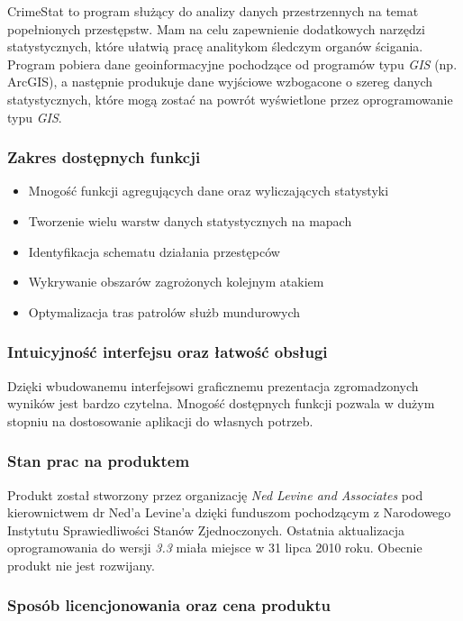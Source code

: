 \documentclass[11pt,a4paper]{article}
\begin{document}
CrimeStat to program służący do analizy danych przestrzennych na temat popełnionych przestępstw. Mam na celu zapewnienie dodatkowych narzędzi statystycznych, które ułatwią pracę analitykom śledczym organów ścigania. Program pobiera dane geoinformacyjne pochodzące od programów typu \emph{GIS} (np. ArcGIS), a następnie produkuje dane wyjściowe wzbogacone o szereg danych statystycznych, które mogą zostać na powrót wyświetlone przez oprogramowanie typu \emph{GIS}. 

\subsubsection*{Zakres dostępnych funkcji}

\begin{itemize}
	\item Mnogość funkcji agregujących dane oraz wyliczających statystyki
	\item Tworzenie wielu warstw danych statystycznych na mapach
	\item Identyfikacja schematu działania przestępców
	\item Wykrywanie obszarów zagrożonych kolejnym atakiem
	\item Optymalizacja tras patrolów służb mundurowych
\end{itemize}

\subsubsection*{Intuicyjność interfejsu oraz łatwość obsługi}

Dzięki wbudowanemu interfejsowi graficznemu prezentacja zgromadzonych wyników jest bardzo czytelna. Mnogość dostępnych funkcji pozwala w dużym stopniu na dostosowanie aplikacji do własnych potrzeb.

\subsubsection*{Stan prac na produktem}

Produkt został stworzony przez organizację \emph{Ned Levine and Associates} pod kierownictwem dr Ned'a Levine'a dzięki funduszom pochodzącym z Narodowego Instytutu Sprawiedliwości Stanów Zjednoczonych. Ostatnia aktualizacja oprogramowania do wersji \emph{3.3} miała miejsce w 31 lipca 2010 roku. Obecnie produkt nie jest rozwijany.

\subsubsection*{Sposób licencjonowania oraz cena produktu}
\end{document}
